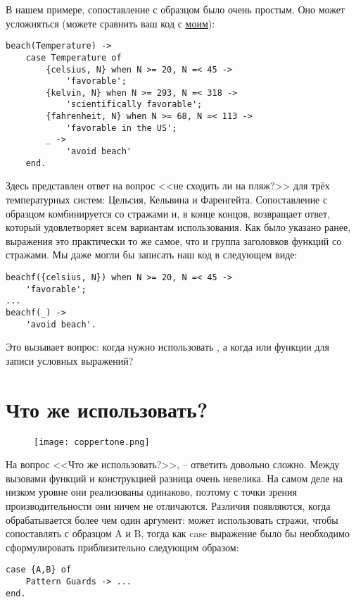 В нашем примере, сопоставление с образцом было очень простым.
Оно может усложняться (можете сравнить ваш код с \href{http://learnyousomeerlang.com/static/erlang/cases.erl}{моим}):
\begin{lstlisting}[style=erlang]
beach(Temperature) ->
    case Temperature of
        {celsius, N} when N >= 20, N =< 45 ->
            'favorable';
        {kelvin, N} when N >= 293, N =< 318 ->
            'scientifically favorable';
        {fahrenheit, N} when N >= 68, N =< 113 ->
            'favorable in the US';
        _ ->
            'avoid beach'
    end.
\end{lstlisting}
Здесь представлен ответ на вопрос <<не сходить ли  на пляж?>> для трёх температурных систем: Цельсия, Кельвина и Фаренгейта.
Сопоставление с образцом комбинируется со стражами и, в конце концов, возвращает ответ, который удовлетворяет всем вариантам использования.
Как было указано ранее,  выражения  это практически то же самое, что и группа заголовков функций со стражами.
Мы даже могли бы записать наш код в следующем виде:
\begin{lstlisting}[style=erlang]
beachf({celsius, N}) when N >= 20, N =< 45 ->
    'favorable';
...
beachf(_) ->
    'avoid beach'.
\end{lstlisting}

Это вызывает вопрос: когда нужно использовать , а когда  или функции для записи условных выражений?
\section{Что же использовать?}
\begin{figure}[h!]
    \texttt{[image: coppertone.png]}
\end{figure}
На вопрос <<Что же использовать?>>, \--- ответить довольно сложно.
Между вызовами функций и конструкцией  разница очень невелика.
На самом деле на низком уровне они реализованы одинаково, поэтому с точки зрения производительности они ничем не отличаются.
Различия появляются, когда обрабатывается более чем один аргумент:  может использовать стражи, чтобы сопоставлять  с образцом A и B, тогда как case выражение было бы необходимо сформулировать приблизительно следующим образом:
\begin{lstlisting}[style=erlang]
case {A,B} of
    Pattern Guards -> ...
end.
\end{lstlisting}

